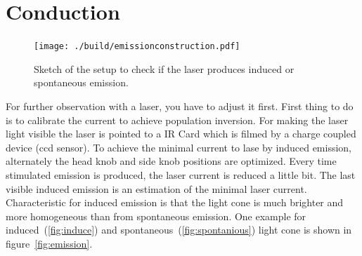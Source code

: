 \section{Conduction}%
\label{sec:conduction}
\begin{figure}
		\centering
		\texttt{[image: ./build/emissionconstruction.pdf]}
		\caption{Sketch of the setup to check if the laser produces induced or
		spontaneous emission. \cite{anleitung}}
		\label{fig:aufbau}
\end{figure}
For further observation with a laser, you have to adjust it first. 
First thing to do is to calibrate the current to achieve population inversion. 
For making the laser light visible the laser is pointed to a IR Card 
which is filmed by a charge coupled device (ccd sensor).
To achieve the minimal current to lase by induced emission, alternately the head
knob and side knob positions are optimized.
Every time stimulated emission is produced, the laser current is reduced a
little bit. 
The last visible induced emission is an estimation of the minimal laser current.
Characteristic for induced emission is that the light cone is
much brighter and more homogeneous than from spontaneous emission.
One example for induced~(\ref{fig:induce}) and spontaneous~(\ref{fig:spontanious}) light cone is
shown in figure~\ref{fig:emission}.
